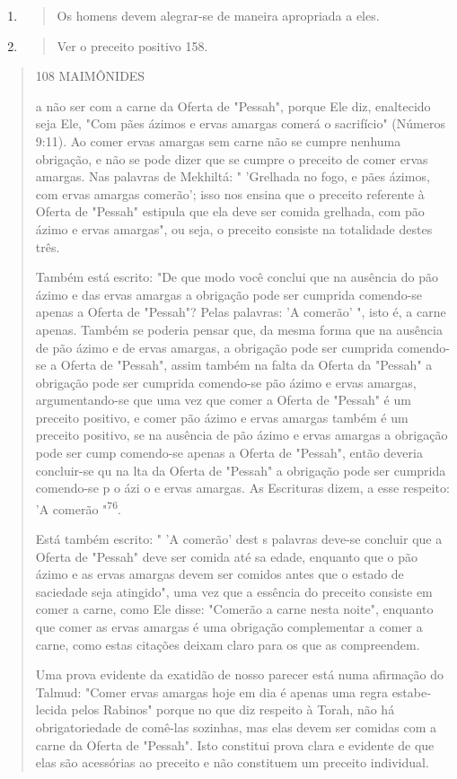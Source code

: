 \begin{enumerate}
\def\labelenumi{\arabic{enumi}.}
\setcounter{enumi}{73}
\item
  \begin{quote}
  Os homens devem alegrar-se de maneira apropriada a eles.
  \end{quote}
\item
  \begin{quote}
  Ver o preceito positivo 158.
  \end{quote}
\end{enumerate}

\begin{quote}
108 MAIMÔNIDES

a não ser com a carne da Oferta de "Pessah", porque Ele diz, enaltecido
seja Ele, "Com pães ázimos e ervas amargas comerá o sacrifício" (Números
9:11). Ao comer ervas amargas sem carne não se cumpre nenhuma obrigação,
e não se pode dizer que se cumpre o preceito de comer ervas amargas. Nas
palavras de Mekhiltá: " 'Grelhada no fogo, e pães ázimos, com ervas
amargas comerão'; isso nos ensina que o preceito referente à Oferta de
"Pessah" estipula que ela deve ser comida grelhada, com pão ázimo e
ervas amargas", ou seja, o preceito consiste na totalidade destes três.

Também está escrito: "De que modo você conclui que na ausência do pão
ázimo e das ervas amargas a obrigação pode ser cumprida comendo-se
apenas a Oferta de "Pessah"? Pelas palavras: 'A comerão' ", isto é, a
carne ape­nas. Também se poderia pensar que, da mesma forma que na
ausência de pão ázimo e de ervas amargas, a obrigação pode ser cumprida
comendo-se a Oferta de "Pessah", assim também na falta da Oferta da
"Pessah" a obrigação pode ser cumprida comendo-se pão ázimo e ervas
amargas, argumentando-se que uma vez que comer a Oferta de "Pessah" é um
preceito positivo, e comer pão ázi­mo e ervas amargas também é um
preceito positivo, se na ausência de pão ázi­mo e ervas amargas a
obrigação pode ser cump comendo-se apenas a Ofer­ta de "Pessah", então
deveria concluir-se qu na lta da Oferta de "Pessah" a obrigação pode ser
cumprida comendo-se p o ázi o e ervas amargas. As Es­crituras dizem, a
esse respeito: 'A comerão "\textsuperscript{76}.

Está também escrito: " 'A comerão' dest s palavras deve-se concluir que
a Oferta de "Pessah" deve ser comida até sa edade, enquanto que o pão
ázimo e as ervas amargas devem ser comidos antes que o estado de
saciedade seja atingido", uma vez que a essência do preceito consiste em
comer a carne, como Ele disse: "Comerão a carne nesta noite", enquanto
que comer as ervas amargas é uma obrigação complementar a comer a carne,
como estas citações deixam claro para os que as compreendem.

Uma prova evidente da exatidão de nosso parecer está numa afirma­ção do
Talmud: "Comer ervas amargas hoje em dia é apenas uma regra
estabe­lecida pelos Rabinos" porque no que diz respeito à Torah, não há
obrigatorie­dade de comê-las sozinhas, mas elas devem ser comidas com a
carne da Oferta de "Pessah". Isto constitui prova clara e evidente de
que elas são acessórias ao preceito e não constituem um preceito
individual.
\end{quote}

